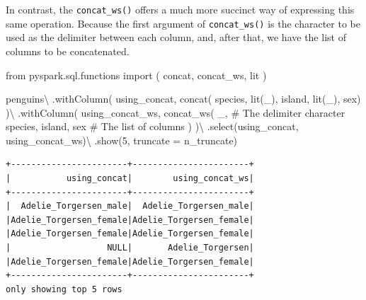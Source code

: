 \documentclass[
  11pt,
  letterpaper,
  DIV=11,
  numbers=noendperiod]{scrreprt}
\newenvironment{Shaded}{\begin{snugshade}}{\end{snugshade}}
\newcommand{\CommentTok}[1]{\textcolor[rgb]{0.37,0.37,0.37}{#1}}
\newcommand{\DecValTok}[1]{\textcolor[rgb]{0.68,0.00,0.00}{#1}}
\newcommand{\ImportTok}[1]{\textcolor[rgb]{0.00,0.46,0.62}{#1}}
\newcommand{\NormalTok}[1]{\textcolor[rgb]{0.00,0.23,0.31}{#1}}
\newcommand{\OperatorTok}[1]{\textcolor[rgb]{0.37,0.37,0.37}{#1}}
\newcommand{\StringTok}[1]{\textcolor[rgb]{0.13,0.47,0.30}{#1}}
\begin{document}
In contrast, the \texttt{concat\_ws()} offers a much more succinct way
of expressing this same operation. Because the first argument of
\texttt{concat\_ws()} is the character to be used as the delimiter
between each column, and, after that, we have the list of columns to be
concatenated.

\begin{Shaded}
\begin{Highlighting}[]
\ImportTok{from}\NormalTok{ pyspark.sql.functions }\ImportTok{import}\NormalTok{ (}
\NormalTok{    concat,}
\NormalTok{    concat\_ws,}
\NormalTok{    lit}
\NormalTok{)}

\NormalTok{penguins}\OperatorTok{\textbackslash{}}
\NormalTok{    .withColumn(}
        \StringTok{\textquotesingle{}using\_concat\textquotesingle{}}\NormalTok{,}
\NormalTok{        concat(}
            \StringTok{\textquotesingle{}species\textquotesingle{}}\NormalTok{, lit(}\StringTok{\textquotesingle{}\_\textquotesingle{}}\NormalTok{), }\StringTok{\textquotesingle{}island\textquotesingle{}}\NormalTok{,}
\NormalTok{            lit(}\StringTok{\textquotesingle{}\_\textquotesingle{}}\NormalTok{), }\StringTok{\textquotesingle{}sex\textquotesingle{}}\NormalTok{)}
\NormalTok{    )}\OperatorTok{\textbackslash{}}
\NormalTok{    .withColumn(}
        \StringTok{\textquotesingle{}using\_concat\_ws\textquotesingle{}}\NormalTok{,}
\NormalTok{        concat\_ws(}
            \StringTok{\textquotesingle{}\_\textquotesingle{}}\NormalTok{, }\CommentTok{\# The delimiter character}
            \StringTok{\textquotesingle{}species\textquotesingle{}}\NormalTok{, }\StringTok{\textquotesingle{}island\textquotesingle{}}\NormalTok{, }\StringTok{\textquotesingle{}sex\textquotesingle{}} \CommentTok{\# The list of columns}
\NormalTok{        )}
\NormalTok{    )}\OperatorTok{\textbackslash{}}
\NormalTok{    .select(}\StringTok{\textquotesingle{}using\_concat\textquotesingle{}}\NormalTok{, }\StringTok{\textquotesingle{}using\_concat\_ws\textquotesingle{}}\NormalTok{)}\OperatorTok{\textbackslash{}}
\NormalTok{    .show(}\DecValTok{5}\NormalTok{, truncate }\OperatorTok{=}\NormalTok{ n\_truncate)}
\end{Highlighting}
\end{Shaded}

\begin{verbatim}
+-----------------------+-----------------------+
|           using_concat|        using_concat_ws|
+-----------------------+-----------------------+
|  Adelie_Torgersen_male|  Adelie_Torgersen_male|
|Adelie_Torgersen_female|Adelie_Torgersen_female|
|Adelie_Torgersen_female|Adelie_Torgersen_female|
|                   NULL|       Adelie_Torgersen|
|Adelie_Torgersen_female|Adelie_Torgersen_female|
+-----------------------+-----------------------+
only showing top 5 rows
\end{verbatim}
\end{document}
